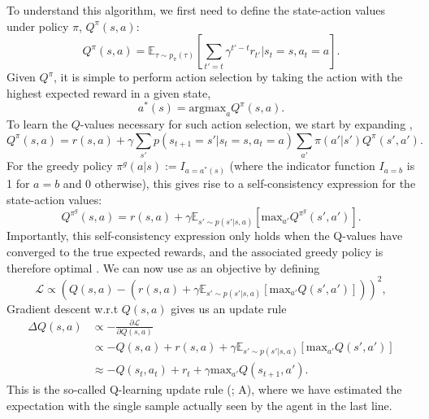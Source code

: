 To understand this algorithm, we first need to define the state-action values under policy $\pi$, $Q^\pi(s, a)$:
\begin{equation}
    \label{eq:Q-values}
    Q^\pi(s,a) =  \mathbb{E}_{\tau \sim p_\pi(\tau)} \left [ \sum_{t'=t} \gamma^{t' - t} r_{t'} | s_{t} = s, a_{t} = a \right ].
\end{equation}
Given $Q^\pi$, it is simple to perform action selection by taking the action with the highest expected reward in a given state,
\begin{equation}
    a^*(s) = \text{argmax}_{a} Q^\pi(s, a).
\end{equation}
To learn the $Q$-values necessary for such action selection, we start by expanding ,
\begin{equation}
    \label{eq:Q-expanded}
    Q^\pi(s,a) = r(s, a) + \gamma \sum_{s'} p(s_{t+1} = s'| s_t=s, a_t=a) \sum_{a'} \pi(a' | s') Q^\pi(s', a').
\end{equation}
For the greedy policy $\pi^g(a|s) := I_{a = a^*(s)}$ (where the indicator function $I_{a = b}$ is 1 for $a=b$ and $0$ otherwise), this gives rise to a self-consistency expression for the state-action values:
\begin{equation}
    \label{eq:Q-optimal}
    Q^{\pi^g}(s,a) = r(s, a) + \gamma \mathbb{E}_{s' \sim p(s' | s, a)} \left [ \text{max}_{a'} Q^{\pi^g}(s', a') \right ].
\end{equation}
Importantly, this self-consistency expression only holds when the Q-values have converged to the true expected rewards, and the associated greedy policy is therefore optimal \citep{sutton2018reinforcement}.
We can now use  as an objective by defining
\begin{equation}
    \mathcal{L} \propto \left (  Q(s,a) - (r(s, a) + \gamma \mathbb{E}_{s' \sim p(s' | s, a)} \left [ \text{max}_{a'} Q(s', a') \right ] ) \right )^2,
\end{equation}
Gradient descent w.r.t $Q(s,a)$ gives us an update rule
\begin{align}
    \Delta  Q(s,a) & \propto - \frac{\partial \mathcal{L}}{\partial  Q(s,a)}\\
    &\propto - Q(s,a) + r(s, a) + \gamma \mathbb{E}_{s' \sim p(s' | s, a)} \left [ \text{max}_{a'} Q(s',a') \right ] \\
    &\approx - Q(s_t,a_t) + r_t + \gamma \text{max}_{a'} Q(s_{t+1}, a').
\end{align}
This is the so-called Q-learning update rule (\citealp{watkins1989learning}; A), where we have estimated the expectation with the single sample actually seen by the agent in the last line.

